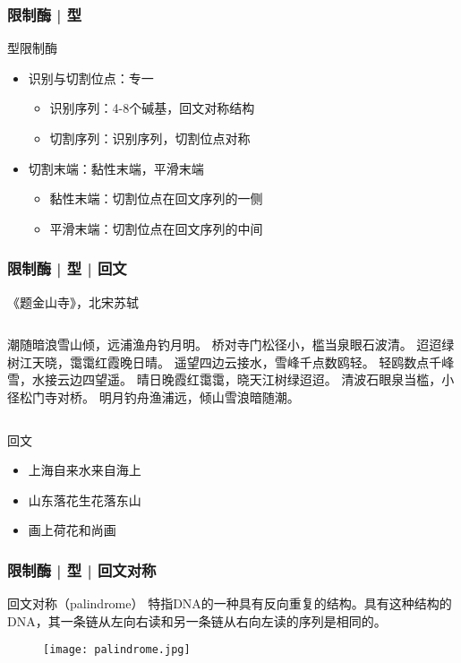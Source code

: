 \begin{frame}
  \frametitle{限制酶 | \alert{型}}
  \begin{block}{型限制酶}
  \begin{itemize}
    \item 识别与切割位点：专一
      \begin{itemize}
        \item 识别序列：4-8个碱基，回文对称结构
        \item 切割序列：识别序列，切割位点对称
      \end{itemize}
    \item 切割末端：黏性末端，平滑末端
      \begin{itemize}
        \item 黏性末端：切割位点在回文序列的一侧
        \item 平滑末端：切割位点在回文序列的中间
      \end{itemize}
  \end{itemize}
  \end{block}
\end{frame}

\begin{frame}
  \frametitle{限制酶 | 型 | 回文}
  \begin{block}{《题金山寺》，北宋\textbullet 苏轼}
  \begin{columns}
潮随暗浪雪山倾，远浦渔舟钓月明。
桥对寺门松径小，槛当泉眼石波清。
迢迢绿树江天晓，霭霭红霞晚日晴。
遥望四边云接水，雪峰千点数鸥轻。
    \pause
轻鸥数点千峰雪，水接云边四望遥。
晴日晚霞红霭霭，晓天江树绿迢迢。
清波石眼泉当槛，小径松门寺对桥。
明月钓舟渔浦远，倾山雪浪暗随潮。
  \end{columns}
  \end{block}
  \pause
  \begin{block}{回文}
    \begin{itemize}
      \item 上海自来水来自海上
      \item 山东落花生花落东山
      \item 画上荷花和尚画
    \end{itemize}
  \end{block}
\end{frame}

\begin{frame}
  \frametitle{限制酶 | 型 | 回文对称}
  \begin{block}{回文对称（palindrome）}
    特指DNA的一种具有反向重复的结构。具有这种结构的DNA，其一条链从左向右读和另一条链从右向左读的序列是相同的。
  \end{block}
  \begin{figure}
    \centering
    \texttt{[image: palindrome.jpg]}
  \end{figure}
\end{frame}

